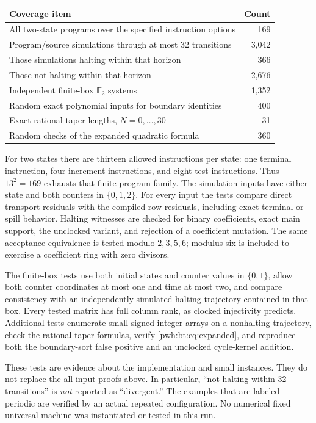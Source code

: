 \documentclass[11pt,letterpaper]{article}
\numberwithin{equation}{section}
\theoremstyle{definition}
\newcommand{\Fbb}{\mathbb F}
\begin{document}
\begin{center}
\begin{tabular}{@{}p{}r@{}}
\toprule
Coverage item & Count\\
\midrule
All two-state programs over the specified instruction options & 169\\
Program/source simulations through at most 32 transitions & 3,042\\
Those simulations halting within that horizon & 366\\
Those not halting within that horizon & 2,676\\
Independent finite-box $\Fbb_2$ systems & 1,352\\
Random exact polynomial inputs for boundary identities & 400\\
Exact rational taper lengths, $N=0,\ldots,30$ & 31\\
Random checks of the expanded quadratic formula & 360\\
\bottomrule
\end{tabular}
\end{center}

For two states there are thirteen allowed instructions per state: one
terminal instruction, four increment instructions, and eight test
instructions. Thus $13^2=169$ exhausts that finite program family. The
simulation inputs have either state and both counters in
$\{0,1,2\}$. For every input the tests compare direct transport residuals
with the compiled row residuals, including exact terminal or spill
behavior. Halting witnesses are checked for binary coefficients, exact
main support, the unclocked variant, and rejection of a coefficient
mutation. The same acceptance equivalence is tested modulo
$2,3,5,6$; modulus six is included to exercise a coefficient ring with
zero divisors.

The finite-box tests use both initial states and counter values in
$\{0,1\}$, allow both counter coordinates at most one and time at most
two, and compare consistency with an independently simulated halting
trajectory contained in that box. Every tested matrix has full column
rank, as clocked injectivity predicts. Additional tests enumerate small
signed integer arrays on a nonhalting trajectory, check the rational
taper formulas, verify \eqref{pwh:bt:eq:expanded}, and reproduce both the
boundary-sort false positive and an unclocked cycle-kernel addition.

These tests are evidence about the implementation and small instances.
They do not replace the all-input proofs above. In particular,
``not halting within 32 transitions'' is \emph{not} reported as
``divergent.'' The examples that are labeled periodic are verified by
an actual repeated configuration. No numerical fixed universal machine
was instantiated or tested in this run.
\end{document}
